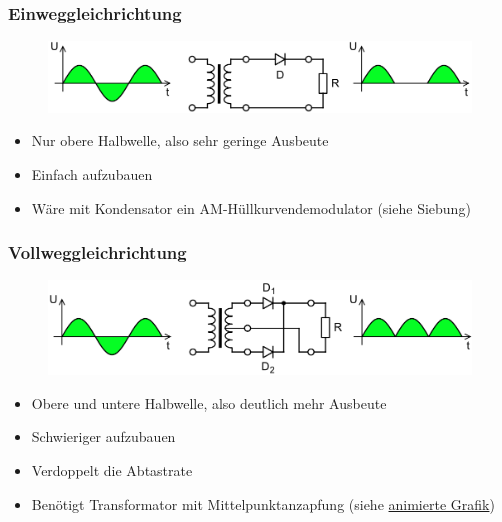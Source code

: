 \begin{frame}
  \frametitle{Einweggleichrichtung}
  \begin{center}
    \begin{figure}
      \includegraphics[width=1\textwidth,height=.6\textheight,keepaspectratio]{a05/Halfwave_rectifier.png}
    \end{figure}
    \begin{itemize}
      \item Nur obere Halbwelle, also sehr geringe Ausbeute
      \item Einfach aufzubauen
      \item Wäre mit Kondensator ein AM-Hüllkurvendemodulator (siehe Siebung)
    \end{itemize}
  \end{center}
\end{frame}

\begin{frame}
  \frametitle{Vollweggleichrichtung}
  \begin{center}
    \begin{figure}
      \includegraphics[width=1\textwidth,height=.6\textheight,keepaspectratio]{a05/Fullwave_rectifier.png}
    \end{figure}
    \begin{itemize}
      \item Obere und untere Halbwelle, also deutlich mehr Ausbeute
      \item Schwieriger aufzubauen
      \item Verdoppelt die Abtastrate
      \item Benötigt Transformator mit Mittelpunktanzapfung (siehe \href{https://commons.wikimedia.org/wiki/File:Gleichrichter_mittelanzapfg_ani.gif}{\ExternalLink animierte Grafik})
    \end{itemize}
  \end{center}
\end{frame}


